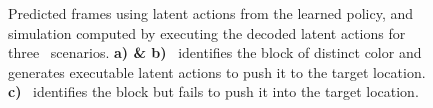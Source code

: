  



\begin{figure}[t]
	
	
	
	
	
	
	
	\vspace{-0.4cm}
	\caption{
		Predicted frames using latent actions from the learned policy, and simulation computed by executing the decoded latent actions for three \RobotDB~scenarios.
		\textbf{a) \& b)} \Method~identifies the block of distinct color and generates executable latent actions to push it to the target location.
		\textbf{c)} \Method~identifies the block but fails to push it into the target location.
	}
	\label{fig: robot beh 00}
\end{figure}
